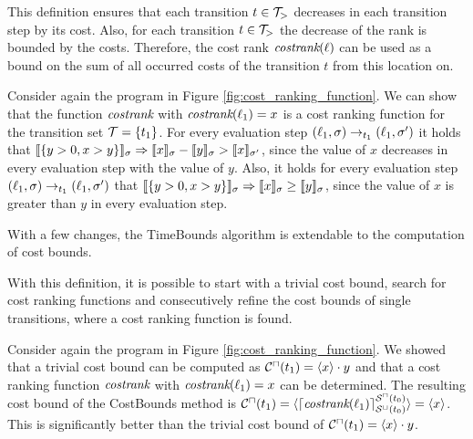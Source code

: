 This definition ensures that each transition $t \in \mathcal{T}_>$ decreases in each transition step by its cost.
Also, for each transition $t \in \mathcal{T}_>$ the decrease of the rank  is bounded by the costs.
Therefore, the cost rank $\emph{costrank}(\ell)$ can be used as a bound on the sum of all occurred costs of the transition $t$ from this location on.

\begin{example}
  Consider again the program in Figure \ref{fig:cost_ranking_function}.
  We can show that the function $\emph{costrank}$ with $\emph{costrank}(\ell_1) = x$ is a cost ranking function for the transition set $\mathcal{T} = \lbrace t_1 \rbrace$.
  For every evaluation step $(\ell_1,\sigma) \rightarrow_{t_1} (\ell_1,\sigma')$ it holds that $\llbracket \lbrace y > 0, x > y \rbrace \rrbracket_{\sigma} \Rightarrow \llbracket x \rrbracket_{\sigma} - \llbracket y \rrbracket_{\sigma} > \llbracket x \rrbracket_{\sigma'}$, since the value of $x$ decreases in every evaluation step with the value of $y$.
  Also, it holds for every evaluation step $(\ell_1,\sigma) \rightarrow_{t_1} (\ell_1,\sigma')$ that $\llbracket \lbrace y > 0, x > y \rbrace \rrbracket_{\sigma} \Rightarrow \llbracket x \rrbracket_{\sigma} \geq \llbracket y \rrbracket_{\sigma}$, since the value of $x$ is greater than $y$ in every evaluation step.
\end{example}

With a few changes, the TimeBounds algorithm is extendable to the computation of cost bounds.



With this definition, it is possible to start with a trivial cost bound, search for cost ranking functions and consecutively refine the cost bounds of single transitions, where a cost ranking function is found.

\begin{example}[CostBounds]
  Consider again the program in Figure \ref{fig:cost_ranking_function}.
  We showed that a trivial cost bound can be computed as ${\mathcal{C}^\sqcap}(t_1) = \langle x\rangle \cdot y$ and that a cost ranking function $\emph{costrank}$ with $\emph{costrank}(\ell_1) = x$ can be determined.
  The resulting cost bound of the CostBounds method is ${\mathcal{C}^\sqcap}(t_1) = \langle\lceil \emph{costrank}(\ell_1) \rceil^{{\mathcal{S}^\sqcap}(t_0)}_{{\mathcal{S}^\sqcup}(t_0)}\rangle = \langle x\rangle$.
  This is significantly better than the trivial cost bound of ${\mathcal{C}^\sqcap}(t_1) = \langle x\rangle \cdot y$.
\end{example}

